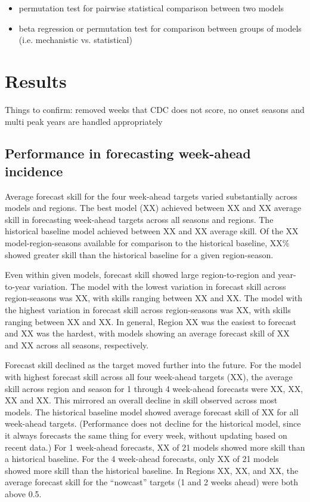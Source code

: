 \documentclass{article}\usepackage[]{graphicx}\usepackage[]{color}
\begin{document}
\begin{itemize}
    \item permutation test for pairwise statistical comparison between two models
    \item beta regression or permutation test for comparison between groups of models (i.e. mechanistic vs. statistical)
\end{itemize}


\section{Results}

Things to confirm: removed weeks that CDC does not score, no onset seasons and multi peak years are handled appropriately

\subsection{Performance in forecasting week-ahead incidence}

Average forecast skill for the four week-ahead targets varied substantially across models and regions.
The best model (XX) achieved between XX and XX average skill in forecasting week-ahead targets across all seasons and regions.
The historical baseline model achieved between XX and XX average skill.
Of the XX model-region-seasons available for comparison to the historical baseline, XX\% showed greater skill than the historical baseline for a given region-season.


Even within given models, forecast skill showed large region-to-region and year-to-year variation. 
The model with the lowest variation in forecast skill across region-seasons was XX, with skills ranging between XX and XX.
The model with the highest variation in forecast skill across region-seasons was XX, with skills ranging between XX and XX.
In general, Region XX was the easiest to forecast and XX was the hardest, with models showing an average forecast skill of XX and XX across all seasons, respectively.

Forecast skill declined as the target moved further into the future.
For the model with highest forecast skill across all four week-ahead targets (XX), the average skill across region and season for 1 through 4 week-ahead forecasts were XX, XX, XX and XX.
This mirrored an overall decline in skill observed across most models.
The historical baseline model showed average forecast skill of XX for all week-ahead targets. (Performance does not decline for the historical model, since it always forecasts the same thing for every week, without updating based on recent data.)
For 1 week-ahead forecasts, XX of 21 models showed more skill than a historical baseline. 
For the 4 week-ahead forecasts, only XX of 21 models showed more skill than the historical baseline.
In Regions XX, XX, and XX, the average forecast skill for the ``nowcast'' targets (1 and 2 weeks ahead) were both above 0.5.
\end{document}
